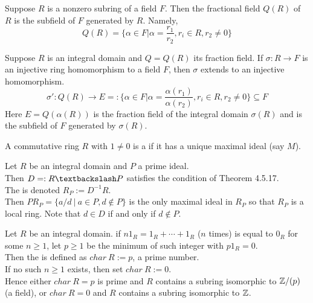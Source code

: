 \begin{corollary}
Suppose $R$ is a nonzero subring of a field $F$. Then the fractional field $Q(R)$ of $R$ is the subfield of $F$ generated by $R$. Namely, 
\begin{equation}
Q(R) = \{\alpha \in F | \alpha = \frac{r_1}{r_2}, r_i \in R, r_2 \neq 0\} \nonumber
\end{equation}
\end{corollary}

\begin{corollary}
Suppose $R$ is an integral domain and $Q = Q(R)$ its fraction field. If $\sigma: R \rightarrow F$ is an injective ring homomorphism to a field $F$, then $\sigma$ extends to an injective homomorphism.
\begin{equation}
\sigma ' : Q(R) \rightarrow E =: \{\alpha \in F | \alpha = \frac{\alpha(r_1)}{\alpha(r_2)}, r_i \in R, r_2 \neq 0\} \subseteq F \nonumber
\end{equation}
Here $E=Q(\alpha(R))$ is the fraction field of the integral domain $\sigma(R)$ and is the subfield of $F$ generated by $\sigma(R)$.
\end{corollary}

\begin{definition}
A commutative ring $R$ with $1 \neq 0$ is a  if it has a unique maximal ideal (say $M$).
\end{definition}

\begin{definition}
Let $R$ be an integral domain and $P$ a prime ideal.\\
Then $D =:R \textbackslash P$ satisfies the condition of Theorem 4.5.17.\\
The  is denoted $R_P := D^{-1}R$.\\
Then $PR_P = \{a/d \ | \ a\in P, d \notin P\}$ is the only maximal ideal in $R_P$ so that $R_P$ is a local ring. Note that $d \in D$ if and only if $d \notin P$.
\end{definition}

\begin{definition}
Let $R$ be an integral domain. if $n 1_R = 1_R + \cdots + 1_R$ ($n$ times) is equal to $0_R$ for some $n \geq 1$, let $p \geq 1$ be the minimum of such integer with $p1_R = 0$.\\
Then the  is defined as $char \ R := p$, a prime number.\\
If no such $n \geq 1$ exists, then set $char \ R := 0$.\\
Hence either $char \ R = p$ is prime and $R$ contains a subring isomorphic to $\mathbb{Z} /(p)$ (a field), or $char \ R = 0$ and $R$ contains a subring isomorphic to $\mathbb{Z}$.
\end{definition}

